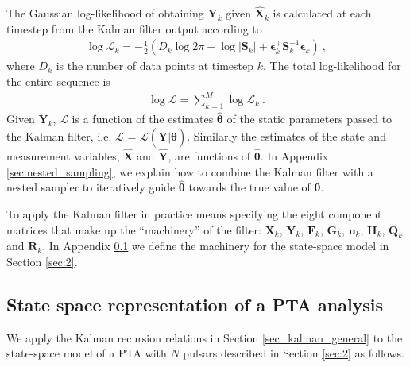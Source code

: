 \documentclass[fleqn,usenatbib,useAMS]{mnras}
\begin{document}
The Gaussian log-likelihood of obtaining ${\boldsymbol{Y}}_k$ given ${\boldsymbol{\hat X}}_k$ is calculated at each timestep from the Kalman filter output according to \citep{zarchan2000fundamentals}
\begin{eqnarray}
	\log \mathcal{L}_k =  -\frac{1}{2} \left (D_k \log 2 \pi + \log  \left | \boldsymbol{S}_k \right | + \boldsymbol{\epsilon}_k^{\intercal} \boldsymbol{S}_k^{-1}  \boldsymbol{\epsilon}_k \right ) \ ,
\end{eqnarray}
where $D_k$ is the number of data points at timestep $k$. The total log-likelihood for the entire sequence is
\begin{eqnarray}
	\log \mathcal{L} =  \sum_{k=1}^{M} \log \mathcal{L}_k \ . \label{eq:likelihood}
\end{eqnarray}
Given ${\boldsymbol{Y}}_k$, $\mathcal{L}$ is a function of the estimates ${\boldsymbol{\hat \theta}}$ of the static parameters passed to the Kalman filter, i.e. $\mathcal{L}$ = $\mathcal{L}(\boldsymbol{Y} | \boldsymbol{\hat \theta})$. Similarly the estimates of the state and measurement variables, $\hat{\boldsymbol{X}}$ and $\hat{\boldsymbol{Y}}$, are functions of $\boldsymbol{\hat \theta}$. In Appendix \ref{sec:nested_sampling}, we explain how to combine the Kalman filter with a nested sampler to iteratively guide ${\boldsymbol{\hat \theta}}$ towards the true value of ${\boldsymbol{\theta}}$. \newline 

To apply the Kalman filter in practice means specifying the eight component matrices that make up the ``machinery'' of the filter: $\boldsymbol{X}_k$, $\boldsymbol{Y}_k$, $\boldsymbol{F}_k$, $\boldsymbol{G}_k$, $\boldsymbol{u}_k$, $\boldsymbol{H}_k$, $\boldsymbol{Q}_k$ and $\boldsymbol{R}_k$. In Appendix \ref{sec_kalman_specific} we define the machinery for the state-space model in Section \ref{sec:2}. 


\subsection{State space representation of a PTA analysis}\label{sec_kalman_specific}
We apply the Kalman recursion relations in Section \ref{sec_kalman_general} to the state-space model of a PTA with $N$ pulsars described in Section \ref{sec:2} as follows. \newline 
\end{document}
